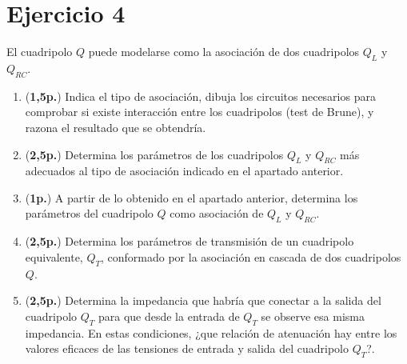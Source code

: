 \documentclass[12pt]{article}
\begin{document}
\clearpage

\section*{Ejercicio 4}

El cuadripolo $Q$ puede modelarse como la asociación de dos cuadripolos $Q_L$ y $Q_{RC}$. 
\begin{enumerate}

\item (\textbf{1,5p.}) Indica el tipo de asociación, dibuja los circuitos necesarios para comprobar si existe interacción entre los cuadripolos (test de Brune), y razona el resultado que se obtendría.

\item (\textbf{2,5p.}) Determina los parámetros de los cuadripolos $Q_L$ y $Q_{RC}$ más adecuados al tipo de asociación indicado en el apartado anterior. 
\item (\textbf{1p.}) A partir de lo obtenido en el apartado anterior, determina los parámetros del cuadripolo $Q$ como asociación de $Q_L$ y $Q_{RC}$.

\item (\textbf{2,5p.}) Determina los parámetros de transmisión de un cuadripolo equivalente, $Q_T$, conformado por la asociación en cascada de dos cuadripolos $Q$. 

\item (\textbf{2,5p.}) Determina la impedancia que habría que conectar a la salida del cuadripolo $Q_T$ para que desde la entrada de $Q_T$ se observe esa misma impedancia. En estas condiciones, ¿que relación de atenuación hay entre los valores eficaces de las tensiones de entrada y salida del cuadripolo $Q_T$?.
\end{enumerate}
\end{document}
